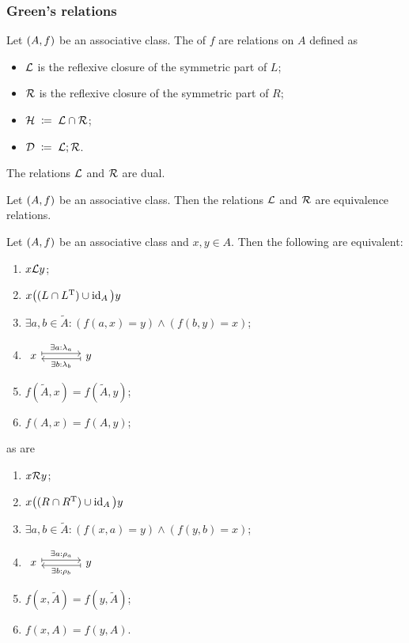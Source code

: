 \subsubsection{Green's relations}
\begin{definition}
Let $\left( A, f \right)$ be an associative class.
The  of $f$ are relations on $A$ defined as
\begin{itemize}
\item $\mathcal{L}$ is the reflexive closure of the symmetric part of $L$;
\item $\mathcal{R}$ is the reflexive closure of the symmetric part of $R$;
\item $\mathcal{H} \;\coloneqq\; \mathcal{L} \cap\mathcal{R}$;
\item $\mathcal{D} \;\coloneqq\; \mathcal{L};\mathcal{R}$.
\end{itemize}
\end{definition}
The relations $\mathcal{L}$ and $\mathcal{R}$ are dual.

\begin{lemma}
Let $\left( A, f \right)$ be an associative class. Then the relations $\mathcal{L}$ and $\mathcal{R}$ are equivalence relations.
\end{lemma}

\begin{lemma}
Let $\left( A, f \right)$ be an associative class and $x, y\in A$. Then the following are equivalent:
\begin{enumerate}
\item $x \mathcal{L} y$;
\item $x\big((L\cap L^{\mathrm{T}}) \cup \operatorname{id}_A\big)y$
\item $\exists a,b\in \widetilde{A}: (f(a, x) = y) \land (f(b, y) = x)$;
\item $\begin{tikzcd}[sep=large]
x \ar[r, maps to, shift left, "\exists a: \lambda_a"] & y \ar[l, maps to, shift left, "\exists b: \lambda_b"]
\end{tikzcd}$
\item $f(\widetilde{A},x) = f(\widetilde{A}, y)$;
\item $f(A,x) = f(A, y)$;
\end{enumerate}
as are
\begin{enumerate}
\item $x \mathcal{R} y$;
\item $x\big((R\cap R^{\mathrm{T}}) \cup \operatorname{id}_A\big)y$
\item $\exists a,b\in \widetilde{A}: (f(x, a) = y) \land (f(y, b) = x)$;
\item $\begin{tikzcd}[sep=large]
x \ar[r, maps to, shift left, "\exists a: \rho_a"] & y \ar[l, maps to, shift left, "\exists b: \rho_b"]
\end{tikzcd}$
\item $f(x, \widetilde{A}) = f(y, \widetilde{A})$;
\item $f(x, A) = f(y, A)$.
\end{enumerate}
\end{lemma}

